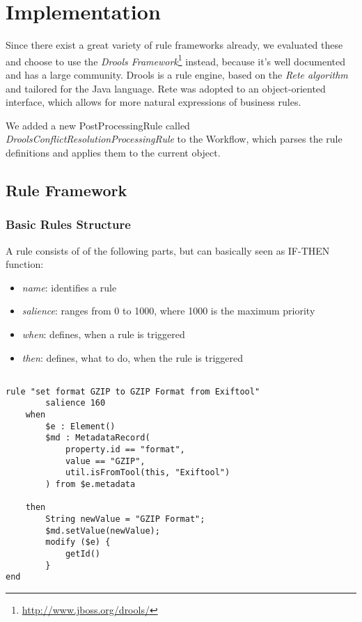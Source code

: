 \documentclass[a4paper,12pt]{article}
\begin{document}
\section{Implementation}

Since there exist a great variety of rule frameworks already, we evaluated these and choose to use the \emph{Drools Framework}\footnote{\url{http://www.jboss.org/drools/}} instead, because it's well documented and has a large community.
Drools is a rule engine, based on the \emph{Rete algorithm} and tailored for the Java language. Rete was adopted to an object-oriented interface, which allows for more natural expressions of business rules.

We added a new PostProcessingRule called \emph{DroolsConflictResolutionProcessingRule} to the Workflow, which parses the rule definitions and applies them to the current object.

\subsection{Rule Framework}

\subsubsection{Basic Rules Structure}

A rule consists of of the following parts, but can basically seen as IF-THEN function:
\begin{itemize}
\item \emph{name}: identifies a rule
\item \emph{salience}: ranges from 0 to 1000, where 1000 is the maximum priority
\item \emph{when}: defines, when a rule is triggered
\item \emph{then}: defines, what to do, when the rule is triggered
\end{itemize}



\newpage
{}
\begin{lstlisting}

rule "set format GZIP to GZIP Format from Exiftool"
        salience 160
    when 
        $e : Element()
        $md : MetadataRecord(
            property.id == "format", 
            value == "GZIP",
            util.isFromTool(this, "Exiftool")
        ) from $e.metadata

    then
        String newValue = "GZIP Format";
        $md.setValue(newValue);
        modify ($e) {
            getId()
        }
end

\end{lstlisting}
\end{document}
